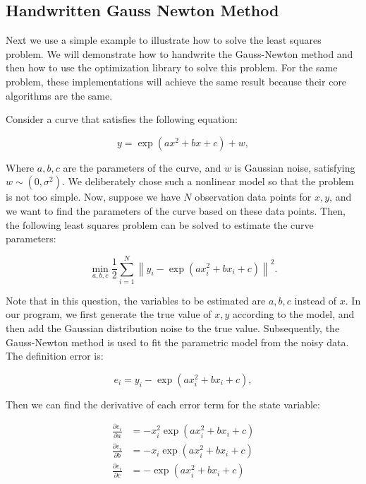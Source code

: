 \subsection{Handwritten Gauss Newton Method}

Next we use a simple example to illustrate how to solve the least squares problem. We will demonstrate how to handwrite the Gauss-Newton method and then how to use the optimization library to solve this problem. For the same problem, these implementations will achieve the same result because their core algorithms are the same.

Consider a curve that satisfies the following equation:

\[
y = \exp( ax^2 + bx + c ) + w,
\]

Where $a,b,c$ are the parameters of the curve, and $w$ is Gaussian noise, satisfying $w \sim (0, \sigma^2)$. We deliberately chose such a nonlinear model so that the problem is not too simple. Now, suppose we have $N$ observation data points for $x,y$, and we want to find the parameters of the curve based on these data points. Then, the following least squares problem can be solved to estimate the curve parameters:

\begin{equation}
\min \limits_{a,b,c} \frac{1}{2}\sum\limits_{i = 1}^N {{{\left\| {{y_i} - \exp \left( {ax_i^2 + bx_i + c} \right)} \right\|}^2}} .
\end{equation}

Note that in this question, the variables to be estimated are $a,b,c$ instead of $x$. In our program, we first generate the true value of $x, y$ according to the model, and then add the Gaussian distribution noise to the true value. Subsequently, the Gauss-Newton method is used to fit the parametric model from the noisy data. The definition error is:

\begin{equation}
e_i = y_i - \exp \left( {ax_i^2 + bx_i + c} \right),
\end{equation}

Then we can find the derivative of each error term for the state variable:

\begin{equation}
\begin{aligned}
\frac{{\partial {e_i}}}{{\partial a}} &=  - x_i^2\exp \left( {ax_i^2 + b{x_i} + c} \right)\\
\frac{{\partial e_i}}{{\partial b}} &=  - {x_i}\exp \left( {ax_i^2 + b{x_i} + c} \right)\\
\frac{{\partial {e_i}}}{{\partial c}} &=  - \exp \left( {ax_i^2 + b{x_i} + c} \right)
\end{aligned}
\end{equation}

